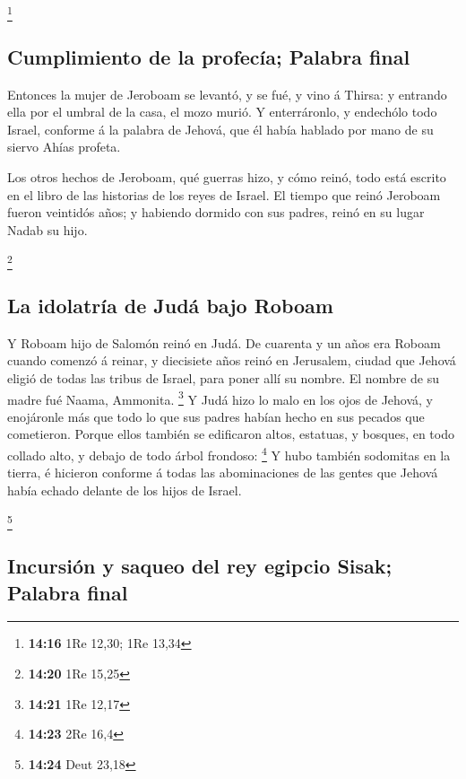 \footnote{\textbf{14:16} 1Re 12,30; 1Re 13,34}

\hypertarget{cumplimiento-de-la-profecuxeda-palabra-final}{%
\subsection{Cumplimiento de la profecía; Palabra
final}\label{cumplimiento-de-la-profecuxeda-palabra-final}}

 Entonces la mujer de Jeroboam se levantó, y se fué, y
vino á Thirsa: y entrando ella por el umbral de la casa, el mozo murió.
 Y enterráronlo, y endechólo todo Israel, conforme á la
palabra de Jehová, que él había hablado por mano de su siervo Ahías
profeta.

 Los otros hechos de Jeroboam, qué guerras hizo, y cómo
reinó, todo está escrito en el libro de las historias de los reyes de
Israel.  El tiempo que reinó Jeroboam fueron veintidós
años; y habiendo dormido con sus padres, reinó en su lugar Nadab su
hijo.

\footnote{\textbf{14:20} 1Re 15,25}

\hypertarget{la-idolatruxeda-de-juduxe1-bajo-roboam}{%
\subsection{La idolatría de Judá bajo
Roboam}\label{la-idolatruxeda-de-juduxe1-bajo-roboam}}

 Y Roboam hijo de Salomón reinó en Judá. De cuarenta y un
años era Roboam cuando comenzó á reinar, y diecisiete años reinó en
Jerusalem, ciudad que Jehová eligió de todas las tribus de Israel, para
poner allí su nombre. El nombre de su madre fué Naama, Ammonita.
\footnote{\textbf{14:21} 1Re 12,17}  Y Judá hizo lo malo
en los ojos de Jehová, y enojáronle más que todo lo que sus padres
habían hecho en sus pecados que cometieron.  Porque ellos
también se edificaron altos, estatuas, y bosques, en todo collado alto,
y debajo de todo árbol frondoso: \footnote{\textbf{14:23} 2Re 16,4}
 Y hubo también sodomitas en la tierra, é hicieron
conforme á todas las abominaciones de las gentes que Jehová había echado
delante de los hijos de Israel.

\footnote{\textbf{14:24} Deut 23,18}

\hypertarget{incursiuxf3n-y-saqueo-del-rey-egipcio-sisak-palabra-final}{%
\subsection{Incursión y saqueo del rey egipcio Sisak; Palabra
final}\label{incursiuxf3n-y-saqueo-del-rey-egipcio-sisak-palabra-final}}

